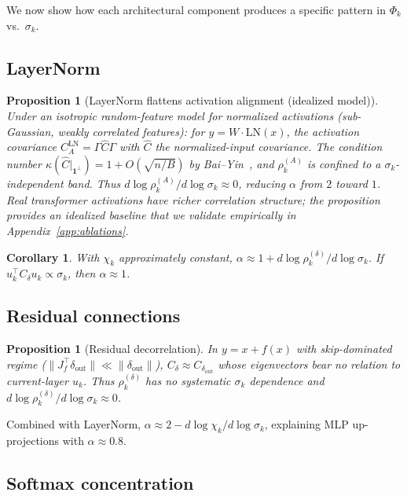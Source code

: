\documentclass{article}
\newtheorem{proposition}[theorem]{Proposition}
\newtheorem{corollary}[theorem]{Corollary}
\begin{document}
We now show how each architectural component produces a specific pattern in $\Phi_k$ vs.\ $\sigma_k$.

\subsection{LayerNorm}

\begin{proposition}[LayerNorm flattens activation alignment (idealized model)]\label{thm:layernorm}
Under an isotropic random-feature model for normalized activations (sub-Gaussian, weakly correlated features): for $y = W \cdot \mathrm{LN}(x)$, the activation covariance $C_A^{\mathrm{LN}} = \Gamma \hat{C} \Gamma$ with $\hat{C}$ the normalized-input covariance. The condition number $\kappa(\hat{C}|_{\mathbf{1}^\perp}) = 1 + O(\sqrt{n/B})$ by Bai--Yin~\cite{baiyin1993}, and $\rho_k^{(A)}$ is confined to a $\sigma_k$-independent band. Thus $d\log\rho_k^{(A)}/d\log\sigma_k \approx 0$, reducing $\alpha$ from $2$ toward $1$. Real transformer activations have richer correlation structure; the proposition provides an idealized baseline that we validate empirically in Appendix~\ref{app:ablations}.
\end{proposition}

\begin{corollary}\label{cor:ln-alpha}
With $\chi_k$ approximately constant, $\alpha \approx 1 + d\log\rho_k^{(\delta)}/d\log\sigma_k$. If $u_k^\top C_\delta u_k \propto \sigma_k$, then $\alpha \approx 1$.
\end{corollary}

\subsection{Residual connections}

\begin{proposition}[Residual decorrelation]\label{prop:residual}
In $y = x + f(x)$ with skip-dominated regime ($\|J_f^\top \delta_{\mathrm{out}}\| \ll \|\delta_{\mathrm{out}}\|$), $C_\delta \approx C_{\delta_{\mathrm{out}}}$ whose eigenvectors bear no relation to current-layer $u_k$. Thus $\rho_k^{(\delta)}$ has no systematic $\sigma_k$ dependence and $d\log\rho_k^{(\delta)}/d\log\sigma_k \approx 0$.
\end{proposition}

Combined with LayerNorm, $\alpha \approx 2 - d\log\chi_k/d\log\sigma_k$, explaining MLP up-projections with $\alpha \approx 0.8$.

\subsection{Softmax concentration}
\end{document}
